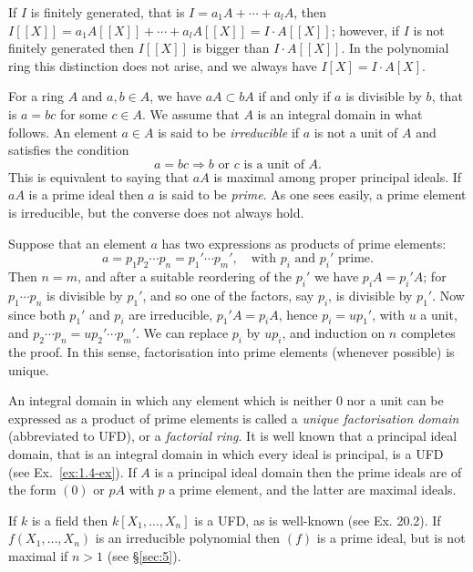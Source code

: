\begin{example}
If $I$ is finitely generated, that is $I = a_1A + \cdots + a_lA$, then $I[[X]] =
a_1A[[X]] + \cdots + a_lA[[X]] = I \cdot A[[X]]$; however, if $I$ is not finitely generated
then $I[[X]]$ is bigger than $I \cdot A[[X]]$. In the polynomial ring this distinction
does not arise, and we always have $I[X] = I \cdot A[X]$.
\end{example}

\begin{example}\label{ex:1.2}
For a ring $A$ and $a, b \in A$, we have $aA \subset bA$ if and only if $a$
is divisible by $b$, that is $a = bc$ for some $c \in A$. We assume that $A$ is an
integral domain in what follows. An element $a \in A$ is said to be \emph{irreducible}
if $a$ is not a unit of $A$ and satisfies the condition
\[
  a = bc \Rightarrow b \text{ or } c \text{ is a unit of } A.
\]
This is equivalent to saying that $aA$ is maximal among proper principal ideals. If $aA$ is a
prime ideal then $a$ is said to be \emph{prime}. As one sees easily,
a prime element is irreducible, but the converse does not always hold.

Suppose that an element $a$ has two expressions as products of prime elements:
\[
  a = p_1p_2 \cdots p_n = p_1' \cdots p_m', \quad \text{with } p_i \text{ and } p_i' \text{ prime}.
\]
Then $n = m$, and after a suitable reordering of the $p_i'$ we have $p_iA = p_i'A$;
for $p_1 \cdots p_n$ is divisible by $p_1'$, and so one of the factors, say $p_i$, is
divisible by $p_1'$. Now since both $p_1'$ and $p_i$ are irreducible, $p_1'A = p_iA$,
hence $p_i = up_1'$, with $u$ a unit, and $p_2 \cdots p_n = up_2' \cdots p_m'$. We can replace
$p_i$ by $up_i$, and induction on $n$ completes the proof. In this sense,
factorisation into prime elements (whenever possible) is unique.

An integral domain in which any element which is neither $0$ nor a unit
can be expressed as a product of prime elements is called a \emph{unique factorisation
domain} (abbreviated to UFD), or a \emph{factorial ring}. It is well
known that a principal ideal domain, that is an integral domain in which
every ideal is principal, is a UFD (see Ex.~\ref{ex:1.4-ex}). If $A$ is a principal ideal
domain then the prime ideals are of the form $(0)$ or $pA$ with $p$ a prime
element, and the latter are maximal ideals.

If $k$ is a field then $k[X_1, \ldots, X_n]$ is a UFD, as is well-known (see Ex. 20.2).
If $f(X_1, \ldots, X_n)$ is an irreducible polynomial then $(f)$ is a prime ideal,
but is not maximal if $n > 1$ (see \S\ref{sec:5}).


\end{example}
